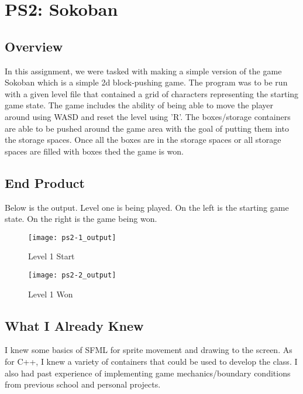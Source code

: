 \section{PS2: Sokoban}\label{sec:ps2}

\subsection{Overview}\label{sec:ps2:overview} %

In this assignment, we were tasked with making a simple version of the game Sokoban which is a simple 2d block-pushing game.
The program was to be run with a given level file that contained a grid of characters representing the starting game state.
The game includes the ability of being able to move the player around using WASD and reset the level using 'R'. 
The boxes/storage containers are able to be pushed around the game area with the goal of putting them into the storage spaces.
Once all the boxes are in the storage spaces or all storage spaces are filled with boxes thed the game is won.

\subsection{End Product}\label{sec:ps2:accomplish} %

Below is the output.
Level one is being played.
On the left is the starting game state.
On the right is the game being won.

\begin{figure}[h]
\centering
\begin{minipage}[b]{0.4\textwidth}
\texttt{[image: ps2-1\_output]}
\caption{Level 1 Start}
\end{minipage}
\hfill
\begin{minipage}[b]{0.4\textwidth}
\texttt{[image: ps2-2\_output]}
\caption{Level 1 Won}
\end{minipage}
\end{figure}

\subsection{What I Already Knew}\label{sec:ps2:knew} %

I knew some basics of SFML for sprite movement and drawing to the screen.
As for C++, I knew a variety of containers that could be used to develop the class.
I also had past experience of implementing game mechanics/boundary conditions from previous school and personal projects.

